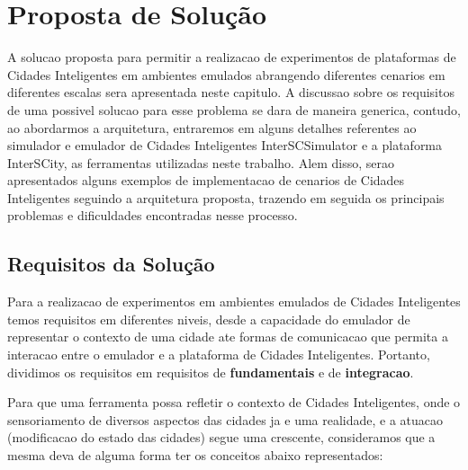 \chapter{Proposta de Solução}
\label{cap:proposta}

A solucao proposta para permitir a realizacao de experimentos de plataformas de Cidades Inteligentes em ambientes emulados abrangendo diferentes cenarios em diferentes escalas sera
apresentada neste capitulo.
A discussao sobre os requisitos de uma possivel solucao para esse problema se dara de maneira generica, contudo, ao abordarmos a arquitetura, entraremos em alguns detalhes referentes ao
simulador e emulador de Cidades Inteligentes InterSCSimulator e a plataforma InterSCity, as ferramentas utilizadas neste trabalho.
Alem disso, serao apresentados alguns exemplos de implementacao de cenarios de Cidades Inteligentes seguindo a arquitetura proposta, trazendo em seguida os principais problemas e
dificuldades encontradas nesse processo.

\section{Requisitos da Solução}

Para a realizacao de experimentos em ambientes emulados de Cidades Inteligentes temos requisitos em diferentes niveis, desde a capacidade do emulador de representar o contexto
de uma cidade ate formas de comunicacao que permita a interacao entre o emulador e a plataforma de Cidades Inteligentes.
Portanto, dividimos os requisitos em requisitos de \textbf{fundamentais} e de \textbf{integracao}.

Para que uma ferramenta possa refletir o contexto de Cidades Inteligentes, onde o sensoriamento de diversos aspectos das cidades ja e uma realidade, e a atuacao (modificacao do estado
das cidades) segue uma crescente, consideramos que a mesma deva de alguma forma ter os conceitos abaixo representados:

